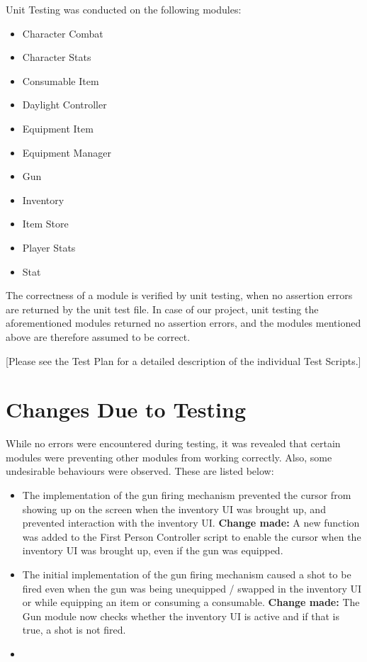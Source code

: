 \documentclass[12pt, titlepage]{article}
\begin{document}
Unit Testing was conducted on the following modules:
\begin{itemize}
	\item Character Combat
	\item Character Stats
	\item Consumable Item
	\item Daylight Controller
	\item Equipment Item
	\item Equipment Manager
	\item Gun
	\item Inventory
	\item Item Store
	\item Player Stats
	\item Stat
\end{itemize}

The correctness of a module is verified by unit testing, when no assertion errors are returned by the unit test file. In case of our project, unit testing the aforementioned modules returned no assertion errors, and the modules mentioned above are therefore assumed to be correct.

[Please see the Test Plan for a detailed description of the individual Test Scripts.]
\section{Changes Due to Testing}

While no errors were encountered during testing, it was revealed that certain modules were preventing other modules from working correctly. Also, some undesirable behaviours were observed. These are listed below:

\begin{itemize}
	\item The implementation of the gun firing mechanism prevented the cursor from showing up on the screen when the inventory UI was brought up, and prevented interaction with the inventory UI.\newline
	\textbf{Change made: } A new function was added to the First Person Controller script to enable the cursor when the inventory UI was brought up, even if the gun was equipped.
	\item The initial implementation of the gun firing mechanism caused a shot to be fired even when the gun was being unequipped / swapped in the inventory UI or while equipping an item or consuming a consumable.\newline
	\textbf{Change made: } The Gun module now checks whether the inventory UI is active and if that is true, a shot is not fired.
	\item 
\end{itemize}
\end{document}
